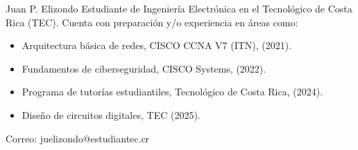 \documentclass[journal]{IEEEtran}
\begin{document}
\begin{IEEEbiographynophoto}{Juan P. Elizondo}
        Estudiante de Ingeniería Electrónica en el Tecnológico de Costa Rica (TEC).
        Cuenta con preparación y/o experiencia en áreas como:
        \begin{itemize}
            \item Arquitectura básica de redes, CISCO CCNA V7 (ITN), (2021).
            \item Fundamentos de ciberseguridad, CISCO Systems, (2022).
            \item Programa de tutorías estudiantiles, Tecnológico de Costa Rica, (2024).
            \item Diseño de circuitos digitales, TEC (2025).
        \end{itemize}
        
        Correo: juelizondo@estudiantec.cr
\end{IEEEbiographynophoto}


\vfill
\end{document}
